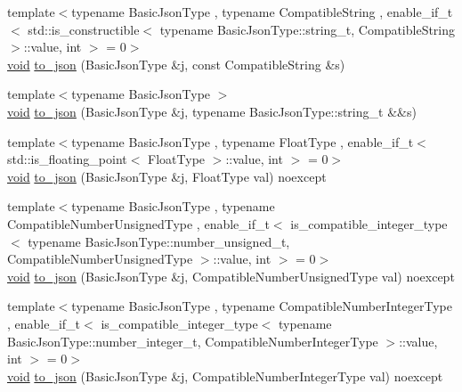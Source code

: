 \begin{DoxyCompactItemize}
\item 
{\footnotesize template$<$typename Basic\+Json\+Type , typename Compatible\+String , enable\+\_\+if\+\_\+t$<$ std\+::is\+\_\+constructible$<$ typename Basic\+Json\+Type\+::string\+\_\+t, Compatible\+String $>$\+::value, int $>$  = 0$>$ }\\\mbox{\hyperlink{namespacenlohmann_1_1detail_a59fca69799f6b9e366710cb9043aa77d}{void}} \mbox{\hyperlink{namespacenlohmann_1_1detail_a7356ed05cdbbb080cee80e1211e1c6c9}{to\+\_\+json}} (Basic\+Json\+Type \&j, const Compatible\+String \&s)
\item 
{\footnotesize template$<$typename Basic\+Json\+Type $>$ }\\\mbox{\hyperlink{namespacenlohmann_1_1detail_a59fca69799f6b9e366710cb9043aa77d}{void}} \mbox{\hyperlink{namespacenlohmann_1_1detail_a4aa1ca6b7c61bf19d1f30ea5b669f68e}{to\+\_\+json}} (Basic\+Json\+Type \&j, typename Basic\+Json\+Type\+::string\+\_\+t \&\&s)
\item 
{\footnotesize template$<$typename Basic\+Json\+Type , typename Float\+Type , enable\+\_\+if\+\_\+t$<$ std\+::is\+\_\+floating\+\_\+point$<$ Float\+Type $>$\+::value, int $>$  = 0$>$ }\\\mbox{\hyperlink{namespacenlohmann_1_1detail_a59fca69799f6b9e366710cb9043aa77d}{void}} \mbox{\hyperlink{namespacenlohmann_1_1detail_a22bffdc8bc7e43af380ba2050696b230}{to\+\_\+json}} (Basic\+Json\+Type \&j, Float\+Type val) noexcept
\item 
{\footnotesize template$<$typename Basic\+Json\+Type , typename Compatible\+Number\+Unsigned\+Type , enable\+\_\+if\+\_\+t$<$ is\+\_\+compatible\+\_\+integer\+\_\+type$<$ typename Basic\+Json\+Type\+::number\+\_\+unsigned\+\_\+t, Compatible\+Number\+Unsigned\+Type $>$\+::value, int $>$  = 0$>$ }\\\mbox{\hyperlink{namespacenlohmann_1_1detail_a59fca69799f6b9e366710cb9043aa77d}{void}} \mbox{\hyperlink{namespacenlohmann_1_1detail_ae5fd66b5517b3b5a6c6b9fd9f29ba8dc}{to\+\_\+json}} (Basic\+Json\+Type \&j, Compatible\+Number\+Unsigned\+Type val) noexcept
\item 
{\footnotesize template$<$typename Basic\+Json\+Type , typename Compatible\+Number\+Integer\+Type , enable\+\_\+if\+\_\+t$<$ is\+\_\+compatible\+\_\+integer\+\_\+type$<$ typename Basic\+Json\+Type\+::number\+\_\+integer\+\_\+t, Compatible\+Number\+Integer\+Type $>$\+::value, int $>$  = 0$>$ }\\\mbox{\hyperlink{namespacenlohmann_1_1detail_a59fca69799f6b9e366710cb9043aa77d}{void}} \mbox{\hyperlink{namespacenlohmann_1_1detail_a91fe576be579c8c2fdd14610605c6dd2}{to\+\_\+json}} (Basic\+Json\+Type \&j, Compatible\+Number\+Integer\+Type val) noexcept

\end{DoxyCompactItemize}
